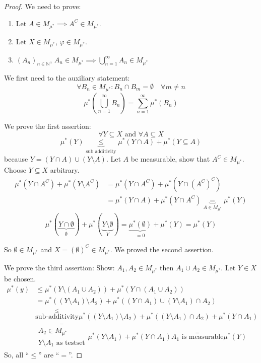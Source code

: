 \documentclass{article}
\begin{document}
\begin{proof}
  We need to prove:
  \begin{enumerate}
    \item Let $A \in M_{\mu^*} \implies A^C \in M_{\mu^*}$.
    \item Let $X \in M_{\mu^*}$, $\varphi \in M_{\mu^*}$.
    \item $(A_n)_{n \in \mathbb N}$, $A_n \in M_{\mu^*} \implies \bigcup_{n=1}^\infty A_n \in M_{\mu^*}$
  \end{enumerate}

  We first need to the auxiliary statement:
  \[ \forall B_n \in M_{\mu^*}: B_n \cap B_m = \emptyset \quad \forall m \neq n \]
  \[ \mu^*\left(\bigcup_{n=1}^{\infty} B_n\right) = \sum_{n=1}^\infty \mu^*(B_n) \]

  We prove the first assertion:
  \[ \forall Y \subseteq X \text{ and } \forall A \subseteq X \]
  \[ \mu^*(Y) \underbrace{\leq}_{\text{sub additivity}} \mu^*(Y \cap A) + \mu^*(Y \subseteq A) \]
  because $Y = (Y \cap A) \cup (Y \setminus A)$.
  Let $A$ be measurable, show that $A^C \in M_{\mu^*}$. Choose $Y \subseteq X$ arbitrary.
  \begin{align*}
    \mu^*(Y \cap A^C) + \mu^*(Y \setminus A^C)
      &= \mu^*(Y \cap A^C) + \mu^*(Y \cap (A^C)^C) \\
      &= \mu^*(Y \cap A) + \mu^*(Y \cap A^C) \underbrace{=}_{A \in M_{\mu^*}} \mu^*(Y)
  \end{align*}
  \[ \mu^*(\underbrace{Y \cap \emptyset}_{\emptyset}) + \mu^*(\underbrace{Y \setminus \emptyset}_{Y}) = \underbrace{\mu^*(\emptyset)}_{=0} + \mu^*(Y) = \mu^*(Y) \]

  So $\emptyset \in M_{\mu^*}$ and $X = (\emptyset)^C \in M_{\mu^*}$.
  We proved the second assertion.

  We prove the third assertion:
  Show: $A_1, A_2 \in M_{\mu^*}$ then $A_1 \cup A_2 \in M_{\mu^*}$.
  Let $Y \in X$ be chosen.
  \begin{align*}
    \mu^*(y)
      &\leq \mu^*(Y \setminus (A_1 \cup A_2)) + \mu^*(Y \cap (A_1 \cup A_2)) \\
      &= \mu^*((Y \setminus A_1) \setminus A_2) + \mu^*((Y \cap A_1) \cup (Y \setminus A_1) \cap A_2) \\
      &\stackrel{\leq}{\text{sub-additivity}} \mu^*((Y \setminus A_1) \setminus A_2) + \mu^*((Y \setminus A_1) \cap A_2) + \mu^*(Y \cap A_1) \\
      &\stackrel{=}{\substack{A_2 \in M_{\mu^*} \\ Y \setminus A_1 \text{ as testset}}} \mu^*(Y \setminus A_1) + \mu^*(Y \cap A_1) \stackrel{=}{A_1 \text{ is measurable}} \mu^*(Y)
  \end{align*}
  So, all \enquote{$\leq$} are \enquote{$=$}.


\end{proof}
\end{document}
